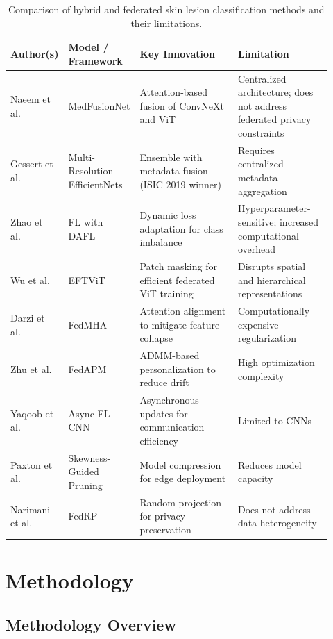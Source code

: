\documentclass{ieeeaccess}
\begin{document}
\begin{table}[h]
\centering
\small
\caption{Comparison of hybrid and federated skin lesion classification methods and their limitations.}
\label{tab:literature_comparison}
\begin{tabular}{@{}p{0.14\linewidth} p{0.16\linewidth} p{0.32\linewidth} p{0.30\linewidth}@{}}
\toprule
\textbf{Author(s)} & \textbf{Model / Framework} & \textbf{Key Innovation} & \textbf{Limitation} \\
\midrule
Naeem et al.~\cite{Naeem2025}
& MedFusionNet
& Attention-based fusion of ConvNeXt and ViT
& Centralized architecture; does not address federated privacy constraints \\[4pt]
Gessert et al.~\cite{Gessert2020}
& Multi-Resolution EfficientNets
& Ensemble with metadata fusion (ISIC 2019 winner)
& Requires centralized metadata aggregation \\[4pt]
Zhao et al.~\cite{Zhao2025}
& FL with DAFL
& Dynamic loss adaptation for class imbalance
& Hyperparameter-sensitive; increased computational overhead \\[4pt]
Wu et al.~\cite{Wu2024}
& EFTViT
& Patch masking for efficient federated ViT training
& Disrupts spatial and hierarchical representations \\[4pt]
Darzi et al.~\cite{Darzi2024}
& FedMHA
& Attention alignment to mitigate feature collapse
& Computationally expensive regularization \\[4pt]
Zhu et al.~\cite{Zhu2025}
& FedAPM
& ADMM-based personalization to reduce drift
& High optimization complexity \\[4pt]
Yaqoob et al.~\cite{Yaqoob2023}
& Async-FL-CNN
& Asynchronous updates for communication efficiency
& Limited to CNNs \\[4pt]
Paxton et al.~\cite{Paxton2024}
& Skewness-Guided Pruning
& Model compression for edge deployment
& Reduces model capacity \\[4pt]
Narimani et al.~\cite{Narimani2024}
& FedRP
& Random projection for privacy preservation
& Does not address data heterogeneity \\
\bottomrule
\end{tabular}
\end{table}

\section{Methodology}

\subsection{Methodology Overview}
\end{document}
